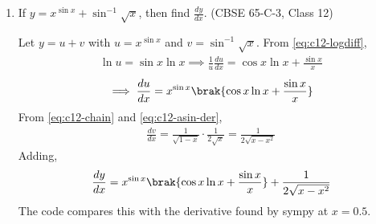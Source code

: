 \begin{enumerate}[label=\thesubsection.\arabic*., ref=\thesubsection.\theenumi]
\solution We solve the alternate question. From \eqref{eq:c12-partial},
\begin{align}
\frac{x}{\brak{x-1}^2\brak{x+2}} = \frac{A}{x-1}+\frac{B}{\brak{x-1}^2}+\frac{C}{x+2}
\end{align}
Multiplying out,
\begin{align}
x = \brak{A+C}x^2+\brak{A+B-2C}x+\brak{-2A+2B+C}
\end{align}
Comparing the coefficients of $x^2$, $x$ and $1$,
\begin{align}
\myvec{1&0&1\\1&1&-2\\-2&2&1}\myvec{A\\B\\C} = \myvec{0\\1\\0}
\implies \myvec{A\\B\\C} = \myvec{\frac{2}{9}\\\frac{1}{3}\\-\frac{2}{9}}
\end{align}
Hence
\begin{align}
\int\frac{x\,dx}{\brak{x-1}^2\brak{x+2}}
= \frac{2}{9}\int\frac{dx}{x-1}+\frac{1}{3}\int\frac{dx}{\brak{x-1}^2}-\frac{2}{9}\int\frac{dx}{x+2}
\end{align}
\begin{align}
= \frac{2}{9}\ln\abs{\frac{x-1}{x+2}}-\frac{1}{3\brak{x-1}}+c
\end{align}
The code finds the partial fractions and checks that the derivative of the answer gives back the integrand.
 
\begin{center}
\end{center}
 
\item If $y=x^{\sin x}+\sin^{-1}\sqrt{x}$, then find $\frac{dy}{dx}$.
\hfill (CBSE 65-C-3, Class 12)
 
\solution Let $y=u+v$ with $u=x^{\sin x}$ and $v=\sin^{-1}\sqrt{x}$. From \eqref{eq:c12-logdiff},
\begin{align}
\ln u = \sin x\ln x
\implies \frac{1}{u}\frac{du}{dx} = \cos x\ln x+\frac{\sin x}{x}
\end{align}
\begin{align}
\implies \frac{du}{dx} = x^{\sin x}\brak{\cos x\ln x+\frac{\sin x}{x}}
\end{align}
From \eqref{eq:c12-chain} and \eqref{eq:c12-asin-der},
\begin{align}
\frac{dv}{dx} = \frac{1}{\sqrt{1-x}}\cdot\frac{1}{2\sqrt{x}} = \frac{1}{2\sqrt{x-x^2}}
\end{align}
Adding,
\begin{align}
\frac{dy}{dx} = x^{\sin x}\brak{\cos x\ln x+\frac{\sin x}{x}}+\frac{1}{2\sqrt{x-x^2}}
\end{align}
The code compares this with the derivative found by sympy at $x=0.5$.
 
\begin{center}
\end{center}
\end{enumerate}
